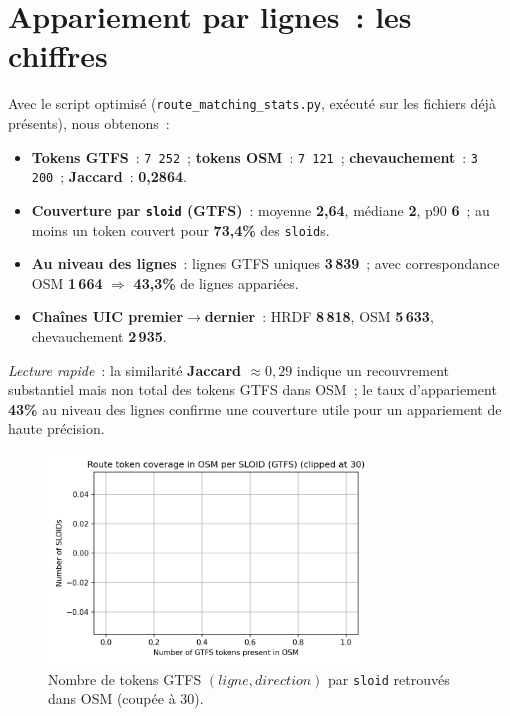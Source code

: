 \section{Appariement par lignes : les chiffres}
Avec le script optimisé (\texttt{route\_matching\_stats.py}, exécuté sur les fichiers déjà présents), nous obtenons :
\begin{itemize}
  \item \textbf{Tokens GTFS} : \texttt{7\,252} ; \textbf{tokens OSM} : \texttt{7\,121} ; \textbf{chevauchement} : \texttt{3\,200} ; \textbf{Jaccard} : \textbf{0,2864}.
  \item \textbf{Couverture par \texttt{sloid} (GTFS)} : moyenne \textbf{2,64}, médiane \textbf{2}, p90 \textbf{6} ; au moins un token couvert pour \textbf{73,4\%} des \texttt{sloid}s.
  \item \textbf{Au niveau des lignes} : lignes GTFS uniques \textbf{3\,839} ; avec correspondance OSM \textbf{1\,664} $\Rightarrow$ \textbf{43,3\%} de lignes appariées.
  \item \textbf{Chaînes UIC premier$\rightarrow$dernier} : HRDF \textbf{8\,818}, OSM \textbf{5\,633}, chevauchement \textbf{2\,935}.
\end{itemize}
\noindent \emph{Lecture rapide} : la similarité \textbf{Jaccard $\approx 0{,}29$} indique un recouvrement substantiel mais non total des tokens GTFS dans OSM ; le taux d'appariement \textbf{43\%} au niveau des lignes confirme une couverture utile pour un appariement de haute précision.

\begin{figure}[H]
  \centering
  \includegraphics[width=0.75\textwidth]{../figures/chap4/hist_route_token_coverage_per_sloid.png}
  \caption{Nombre de tokens GTFS \((ligne, direction)\) par \texttt{sloid} retrouvés dans OSM (coupée à 30).}
\end{figure}

